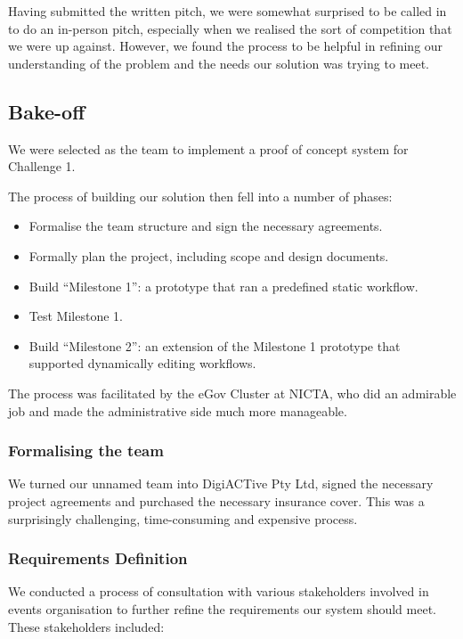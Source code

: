 \documentclass[12pt,a4paper,twosided]{article}
\begin{document}
Having submitted the written pitch, we were somewhat surprised to be
called in to do an in-person pitch, especially when we realised the sort
of competition that we were up against. However, we found the process to
be helpful in refining our understanding of the problem and the needs
our solution was trying to meet.

\subsection{Bake-off}

We were selected as the team to implement a proof of concept system for Challenge 1.

The process of building our solution then fell into a
number of phases:

\begin{itemize}

\item
  Formalise the team structure and sign the necessary agreements.
\item
  Formally plan the project, including scope and design documents.
\item
  Build ``Milestone 1'': a prototype that ran a predefined static
  workflow.
\item
  Test Milestone 1.
\item
  Build ``Milestone 2'': an extension of the Milestone 1 prototype that
  supported dynamically editing workflows.
\end{itemize}

The process was facilitated by the eGov Cluster at NICTA, who did an
admirable job and made the administrative side much more manageable.

\subsubsection{Formalising the team}

We turned our unnamed team into DigiACTive Pty Ltd, signed the
necessary project agreements and purchased the necessary insurance
cover. This was a surprisingly challenging, time-consuming and expensive
process.

\subsubsection{Requirements Definition}

We conducted a process of consultation with various stakeholders involved
in events organisation to further refine the requirements our system should 
meet. These stakeholders included:
\end{document}
